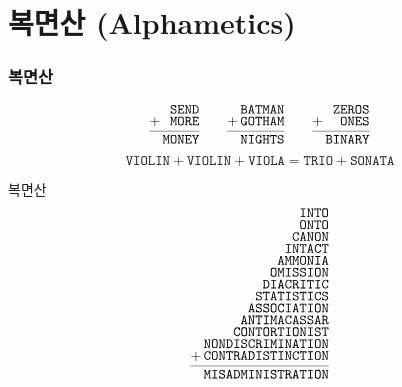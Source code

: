 \documentclass{beamer}
\begin{document}
%

\section{복면산 (Alphametics)}

%
\begin{frame}
  \frametitle{복면산}
  {\LARGE
  \[
  \def\arraystretch{0.7}
  \begin{array}{c@{\,}r}
    & \texttt{SEND} \\
    + & \texttt{MORE} \\
    \cmidrule(lr){1-2}
    & \texttt{MONEY}
  \end{array}
  \quad
  \def\arraystretch{0.7}
  \begin{array}{c@{\,}r}
    & \texttt{BATMAN} \\
    + & \texttt{GOTHAM} \\
    \cmidrule(lr){1-2}
    & \texttt{NIGHTS}
  \end{array}
  \quad
  \begin{array}{c@{\,}r}
    & \texttt{ZEROS} \\
    + & \texttt{ONES} \\
    \cmidrule(lr){1-2}
    & \texttt{BINARY}
  \end{array}
  \]
  }
  \vspace{5mm}
  {\Large
    \[ \texttt{VIOLIN}+\texttt{VIOLIN}+\texttt{VIOLA}%
    =\texttt{TRIO}+\texttt{SONATA} \]
  }
\end{frame}

%
\begin{frame}{복면산}
  \[
  \def\arraystretch{0.7}
  \begin{array}{c@{\,}r}
    & \texttt{INTO} \\
    & \texttt{ONTO} \\
    & \texttt{CANON} \\
    & \texttt{INTACT} \\
    & \texttt{AMMONIA} \\
    & \texttt{OMISSION} \\
    & \texttt{DIACRITIC} \\
    & \texttt{STATISTICS} \\
    & \texttt{ASSOCIATION} \\
    & \texttt{ANTIMACASSAR} \\
    & \texttt{CONTORTIONIST} \\
    & \texttt{NONDISCRIMINATION} \\
    + & \texttt{CONTRADISTINCTION} \\
    \cmidrule(lr){1-2}
    & \texttt{MISADMINISTRATION}
  \end{array}
  \]
\end{frame}
\end{document}
